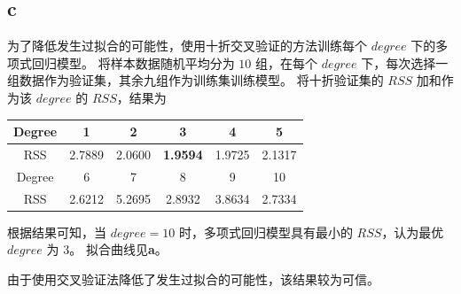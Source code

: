 \documentclass[12pt,a4paper]{article}
\begin{document}
    \subsection*{c}
    为了降低发生过拟合的可能性，使用十折交叉验证的方法训练每个 $degree$ 下的多项式回归模型。
    将样本数据随机平均分为 $10$ 组，在每个 $degree$ 下，每次选择一组数据作为验证集，其余九组作为训练集训练模型。
    将十折验证集的 $RSS$ 加和作为该 $degree$ 的 $RSS$，结果为
    \begin{longtable}{c|c|c|c|c|c}
        \hline
        Degree & 1 & 2 & 3 & 4 & 5\\
        \hline
        RSS & 2.7889 & 2.0600 & \textbf{1.9594} & 1.9725 & 2.1317\\
        \hline
        \hline
        Degree & 6 & 7 & 8 & 9 & 10\\
        \hline
        RSS & 2.6212 & 5.2695 & 2.8932 & 3.8634 & 2.7334\\
        \hline
    \end{longtable}
    根据结果可知，当 $degree=10$ 时，多项式回归模型具有最小的 $RSS$，认为最优 $degree$ 为 $3$。
    拟合曲线见\textbf{a}。\par
    由于使用交叉验证法降低了发生过拟合的可能性，该结果较为可信。
\end{document}
